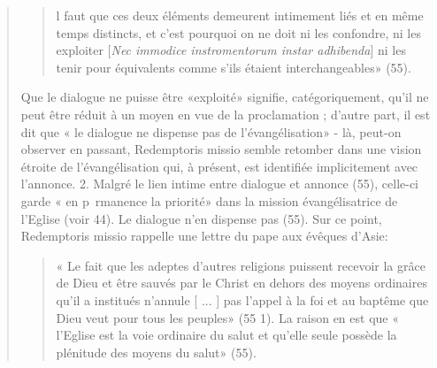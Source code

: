 \begin{quote}
\begin{quote}
    l faut que ces deux éléments demeurent intimement liés et en même temps distincts, et c'est pourquoi on ne doit ni les
confondre, ni les exploiter [\emph{Nec immodice instromentorum instar adhibenda}] ni les tenir pour équivalents comme s'ils
étaient interchangeables» (55).
\end{quote}
Que le dialogue ne puisse être «exploité» signifie, catégoriquement,
qu'il ne peut être réduit à un moyen en vue de la
proclamation ; d'autre part, il est dit que « le dialogue ne
dispense pas de l'évangélisation» - là, peut-on observer en
passant, Redemptoris missio semble retomber dans une vision
étroite de l'évangélisation qui, à présent, est identifiée implicitement
avec l'annonce.
2. Malgré le lien intime entre dialogue et annonce (55),
celle-ci garde « en p~rmanence la priorité» dans la mission
évangélisatrice de l'Eglise (voir 44). Le dialogue n'en dispense
pas (55). Sur ce point, Redemptoris missio rappelle une
lettre du pape aux évêques d'Asie: 
\begin{quote}
    « Le fait que les adeptes
d'autres religions puissent recevoir la grâce de Dieu et être
sauvés par le Christ en dehors des moyens ordinaires qu'il a
institués n'annule [ ... ] pas l'appel à la foi et au baptême que
Dieu veut pour tous les peuples» (55 1). La raison en est que
« l'Eglise est la voie ordinaire du salut et qu'elle seule possède
la plénitude des moyens du salut» (55).
\end{quote}


\end{quote}
